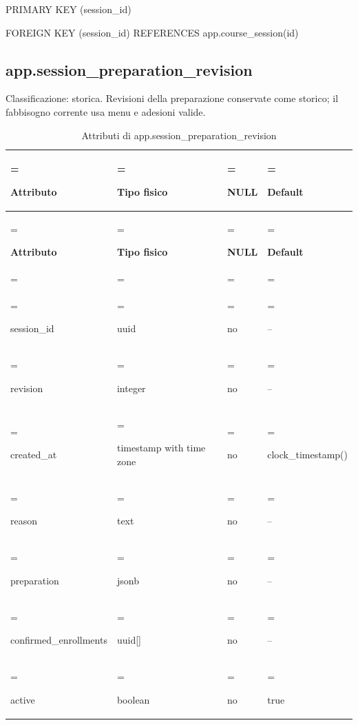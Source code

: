 \documentclass[11pt,a4paper]{article}
\begin{document}
{\ttfamily\small PRIMARY KEY (\allowbreak{}session\_\allowbreak{}id)}\par

{\ttfamily\small FOREIGN KEY (\allowbreak{}session\_\allowbreak{}id) REFERENCES app.\allowbreak{}course\_\allowbreak{}session(\allowbreak{}id)}\par

\subsection{app.session\_preparation\_revision}

Classificazione: storica. Revisioni della preparazione conservate come storico; il fabbisogno corrente usa menu e adesioni valide.

{\small \renewcommand{\arraystretch}{1.2}

\begin{xltabular}{\linewidth}{>{\hsize\linewidth=\hsize\raggedright\arraybackslash}X>{\hsize\linewidth=\hsize\raggedright\arraybackslash}X>{\hsize\linewidth=\hsize\raggedright\arraybackslash}X>{\hsize\linewidth=\hsize\raggedright\arraybackslash}X}
\caption{Attributi di app.session\_preparation\_revision}\label{tab:dictionary-25}\\
\toprule

\textbf{Attributo} & \textbf{Tipo fisico} & \textbf{NULL} & \textbf{Default}\\\midrule\endfirsthead\toprule\textbf{Attributo} & \textbf{Tipo fisico} & \textbf{NULL} & \textbf{Default}\\\midrule\endhead
\midrule{}\\\endfoot\bottomrule\endlastfoot


{\ttfamily\small session\_\allowbreak{}id} & {\ttfamily\small uuid} & no & {\ttfamily\small --}\\\addlinespace[3pt]

{\ttfamily\small revision} & {\ttfamily\small integer} & no & {\ttfamily\small --}\\\addlinespace[3pt]

{\ttfamily\small created\_\allowbreak{}at} & {\ttfamily\small timestamp with time zone} & no & {\ttfamily\small clock\_\allowbreak{}timestamp(\allowbreak{})}\\\addlinespace[3pt]

{\ttfamily\small reason} & {\ttfamily\small text} & no & {\ttfamily\small --}\\\addlinespace[3pt]

{\ttfamily\small preparation} & {\ttfamily\small jsonb} & no & {\ttfamily\small --}\\\addlinespace[3pt]

{\ttfamily\small confirmed\_\allowbreak{}enrollments} & {\ttfamily\small uuid[]} & no & {\ttfamily\small --}\\\addlinespace[3pt]

{\ttfamily\small active} & {\ttfamily\small boolean} & no & {\ttfamily\small true}\\*

\end{xltabular}}
\end{document}
